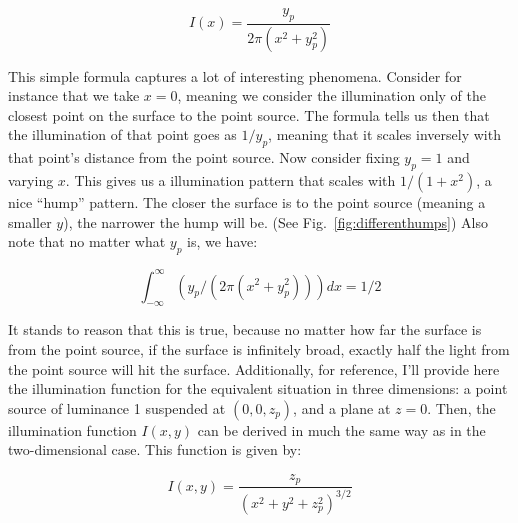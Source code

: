     $$I(x) = \frac{y_p}{2\pi(x^2 + y_p^2)}$$
    
    This simple formula captures a lot of interesting phenomena. Consider for instance that we take $x = 0$, meaning we consider the illumination only of the closest point on the surface to the point source. The formula tells us then that the illumination of that point goes as $1/y_p$, meaning that it scales inversely with that point's distance from the point source. Now consider fixing $y_p = 1$ and varying $x$. This gives us a illumination pattern that scales with $1/(1+x^2)$, a nice ``hump'' pattern. The closer the surface is to the point source (meaning a smaller $y$), the narrower the hump will be. (See Fig.~\ref{fig:differenthumps}) Also note that no matter what $y_p$ is, we have:
    
    
$$\int_{-\infty}^\infty (y_p/(2\pi(x^2 + y_p^2))) dx = 1/2$$

It stands to reason that this is true, because no matter how far the surface is from the point source, if the surface is infinitely broad, exactly half the light from the point source will hit the surface. Additionally, for reference, I'll provide here the illumination function for the equivalent situation in three dimensions: a point source of luminance 1 suspended at $(0, 0, z_p)$, and a plane at $z=0$. Then, the illumination function $I(x, y)$ can be derived in much the same way as in the two-dimensional case. This function is given by:

$$I(x, y) = \frac{z_p}{(x^2 + y^2 + z_p^2)^{3/2}}$$

